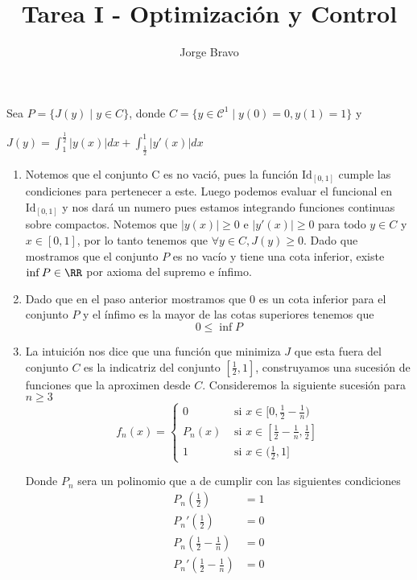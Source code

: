 \documentclass[a4paper,oneside,10.5pt]{USMArt}
\title{Tarea I - Optimización y Control}
\author{Jorge Bravo}
\begin{document}
\maketitle

\begin{sol}
  Sea $P = \{J(y) \; | \; y \in C\}$, donde $C = \{y \in \mathcal{C}^{1} \; | \; y(0) = 0, y(1) = 1\}$ y

  $J(y) = \int_{1}^{\frac12} |y(x)| dx + \int_{\frac12}^1 |y'(x)| dx$

  \begin{enumerate}
    \item Notemos que el conjunto C es no vació, pues la función $\text{Id}_{[0, 1]}$ cumple las condiciones para pertenecer a este. Luego podemos evaluar el funcional en $\text{Id}_{[0, 1]}$ y nos dará un numero pues estamos integrando funciones continuas sobre compactos. Notemos que $|y(x)| \geq 0$ e $|y'(x)| \geq 0$ para todo $y \in C$ y $x \in [0, 1]$, por lo tanto tenemos que $\forall y \in C, J(y) \geq 0$. Dado que mostramos que el conjunto $P$ es no vacío y tiene una cota inferior, existe $\inf P \in \RR$ por axioma del supremo e ínfimo.

    \item Dado que en el paso anterior mostramos que $0$ es un cota inferior para el conjunto $P$ y el ínfimo es la mayor de las cotas superiores tenemos que
    \begin{equation*}
      0 \leq \inf P
    \end{equation*}

    \item La intuición nos dice que una función que minimiza $J$ que esta fuera del conjunto $C$ es la indicatriz del conjunto $[\frac12, 1]$, construyamos una sucesión de funciones que la aproximen desde $C$. Consideremos la siguiente sucesión para $n \geq 3$
    \begin{equation*}
      f_{n}(x) = \begin{cases}
        0 & \text{ si } x \in [0, \frac12 - \frac1n)\\
        P_{n}(x) & \text{ si } x \in [\frac12 - \frac1n, \frac12]\\
        1 & \text{ si } x \in (\frac12, 1]
        \end{cases}
    \end{equation*}

          Donde $P_{n}$ sera un polinomio que a de cumplir con las siguientes condiciones
    \begin{align*}
      P_{n}(\frac12) &= 1\\
      P_{n}'(\frac12) &= 0\\
      P_{n}(\frac12 - \frac1n) &= 0\\
      P_{n}'(\frac12 - \frac1n) &= 0
    \end{align*}


\end{enumerate}
\end{sol}
\end{document}
